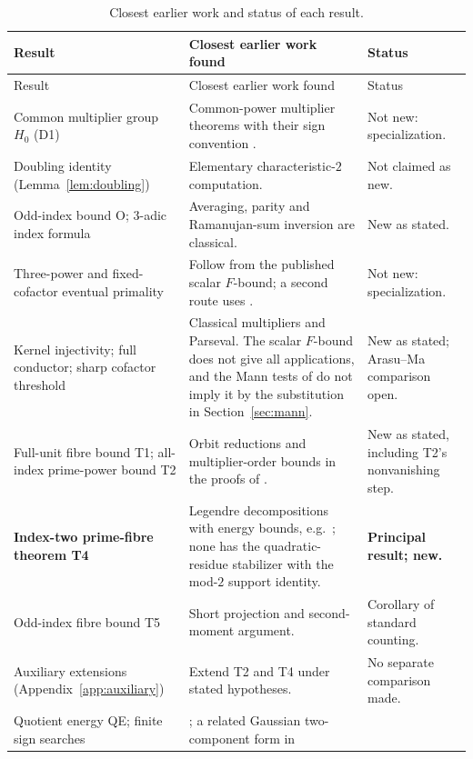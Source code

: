 \documentclass[11pt]{article}
\theoremstyle{definition}
\theoremstyle{remark}
\begin{document}
\begingroup
\small
\setlength{\tabcolsep}{4pt}
\renewcommand{\arraystretch}{1.13}
\begin{longtable}{>{\raggedright\arraybackslash}p{}>{\raggedright\arraybackslash}p{}>{\raggedright\arraybackslash}p{}}
\caption{Closest earlier work and status of each result.}
\label{tab:novelty}\\
\hline
Result & Closest earlier work found & Status \\
\hline
\endfirsthead
\hline
Result & Closest earlier work found & Status \\
\hline
\endhead
Common multiplier group $H_0$ (D1)
& Common-power multiplier theorems with their sign convention
  \cite[Theorems~5.2--5.4]{DGS71}.
& Not new: specialization. \\
Doubling identity (Lemma~\ref{lem:doubling})
& Elementary characteristic-$2$ computation.
& Not claimed as new. \\
Odd-index bound O; $3$-adic index formula
& Averaging, parity and Ramanujan-sum inversion are classical.
& New as stated. \\
Three-power and fixed-cofactor eventual primality
& Follow from the published scalar $F$-bound; a second route uses
  \cite{DGS71}.
& Not new: specialization. \\
Kernel injectivity; full conductor; sharp cofactor threshold
& Classical multipliers and Parseval. The scalar $F$-bound does not give
  all applications, and the Mann tests of \cite{AJMP95,JP99} do not imply
  it by the substitution in Section~\ref{sec:mann}.
& New as stated; Arasu--Ma comparison open. \\
Full-unit fibre bound T1; all-index prime-power bound T2
& Orbit reductions and multiplier-order bounds in the proofs of
  \cite[Theorems~4.6 and~4.10]{Tan18}.
& New as stated, including T2's nonvanishing step. \\
\textbf{Index-two prime-fibre theorem T4}
& Legendre decompositions with energy bounds, e.g.\ \cite[Theorem~4.3]{Tan18};
  none has the quadratic-residue stabilizer with the mod-$2$ support identity.
& \textbf{Principal result; new.} \\
Odd-index fibre bound T5
& Short projection and second-moment argument.
& Corollary of standard counting. \\
Auxiliary extensions (Appendix~\ref{app:auxiliary})
& Extend T2 and T4 under stated hypotheses.
& No separate comparison made. \\
Quotient energy QE; finite sign searches
& \cite{JP99,AGZ21,Gordon26}; a related Gaussian two-component form in

\end{longtable}
\end{document}

